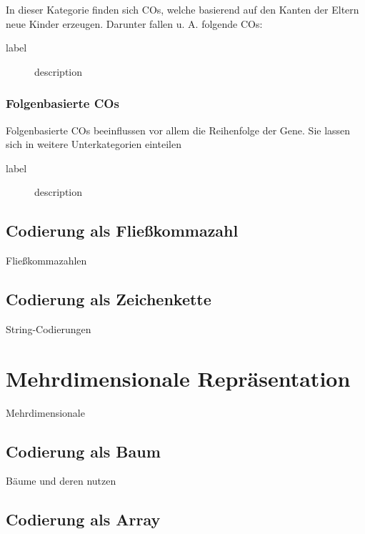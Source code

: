 \documentclass{llncs}
\begin{document}
			In dieser Kategorie finden sich COs, welche basierend auf den Kanten der Eltern neue Kinder erzeugen. Darunter fallen u. A. folgende COs:
			
			\begin{description}
				\item[label] description
			\end{description}
		
		\subsubsection{Folgenbasierte COs}
		
			Folgenbasierte COs beeinflussen vor allem die Reihenfolge der Gene. Sie lassen sich in weitere Unterkategorien einteilen
			
			\begin{description}
				\item[label] description
			\end{description}
	
	\subsection{Codierung als Fließkommazahl}
	\label{sec:FloatCod}
	
		Fließkommazahlen
	
	\subsection{Codierung als Zeichenkette}
	\label{sec:StrCod}
	
		String-Codierungen

\section{Mehrdimensionale Repräsentation}
\label{sec:MehrdimRep}

	Mehrdimensionale

	\subsection{Codierung als Baum}
	\label{sec:BaumCod}
	
		Bäume und deren nutzen
	
	\subsection{Codierung als Array}
	\label{sec:ArrayCod}
	
\end{document}

